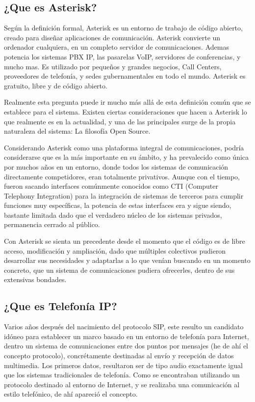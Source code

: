 \subsection{¿Que es Asterisk?}

Según la definición formal, Asterisk es un entorno de trabajo de código abierto, creado para diseñar aplicaciones de comunicación. Asterisk convierte un ordenador cualquiera, en un completo servidor de comunicaciones. Ademas potencia los sistemas PBX IP, las pasarelas VoIP, servidores de conferencias, y mucho mas. Es utilizado por pequeños y grandes negocios, Call Centers, proveedores de telefonía, y sedes gubernamentales en todo el mundo. Asterisk es gratuito, libre y de código abierto.

Realmente esta pregunta puede ir mucho más allá de esta definición común que se establece para el sistema. Existen ciertas consideraciones que hacen a Asterisk lo que realmente es en la actualidad, y una de las principales surge de la propia naturaleza del sistema: La filosofía Open Source.

Considerando Asterisk como una plataforma integral de comunicaciones, podría considerarse que es la más importante en su ámbito, y ha prevalecido como única por muchos años en un entorno, donde todos los sistemas de comunicación directamente competidores, eran totalmente privativos. Aunque con el tiempo, fueron sacando interfaces comúnmente conocidos como CTI (Computer Telephony Integration) para la integración de sistemas de terceros para cumplir funciones muy específicas, la potencia de estas interfaces era y sigue siendo, bastante limitada dado que el verdadero núcleo de los sistemas privados, permanencia cerrado al público.

Con Asterisk se sienta un precedente desde el momento que el código es de libre acceso, modificación y ampliación, dado que múltiples colectivos pudieron desarrollar sus necesidades y adaptarlas a lo que venían buscando en un momento concreto, que un sistema de comunicaciones pudiera ofrecerles, dentro de sus extensivas bondades. 

\subsection{¿Que es Telefonía IP?}

Varios años después del nacimiento del protocolo SIP, este resulto un candidato idóneo para establecer un marco basado en un entorno de telefonía para Internet, dentro un sistema de comunicaciones entre dos puntos por mensajes (he de ahí el concepto protocolo), concrétamente destinadas al envío y recepción de datos multimedia. Los primeros datos, resultaron ser de tipo audio exactamente igual que los sistemas tradicionales de telefonía. Como se encontraban utilizando un protocolo destinado al entorno de Internet, y se realizaba una comunicación al estilo telefónico, de ahí apareció el concepto.

